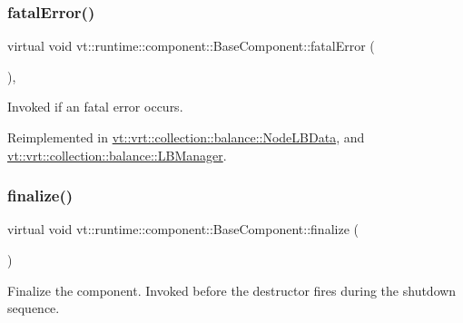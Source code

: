 \subsubsection{\texorpdfstring{fatal\+Error()}{fatalError()}}
{\footnotesize\ttfamily virtual void vt\+::runtime\+::component\+::\+Base\+Component\+::fatal\+Error (\begin{DoxyParamCaption}{ }\end{DoxyParamCaption})\hspace{0.3cm}{\ttfamily [inline]}, {\ttfamily [virtual]}}



Invoked if an fatal error occurs. 



Reimplemented in \hyperlink{structvt_1_1vrt_1_1collection_1_1balance_1_1_node_l_b_data_aefbc8058f2d74c3dd6c903e9bfefe0d2}{vt\+::vrt\+::collection\+::balance\+::\+Node\+L\+B\+Data}, and \hyperlink{structvt_1_1vrt_1_1collection_1_1balance_1_1_l_b_manager_ac13941c766e8b1b34c8591515e7942d3}{vt\+::vrt\+::collection\+::balance\+::\+L\+B\+Manager}.

\mbox{\label{structvt_1_1runtime_1_1component_1_1_base_component_ac03e2177ad2e26b1b8cb94c7e47e3eff}} 
\subsubsection{\texorpdfstring{finalize()}{finalize()}}
{\footnotesize\ttfamily virtual void vt\+::runtime\+::component\+::\+Base\+Component\+::finalize (\begin{DoxyParamCaption}{ }\end{DoxyParamCaption})\hspace{0.3cm}{\ttfamily [pure virtual]}}



Finalize the component. Invoked before the destructor fires during the shutdown sequence. 




